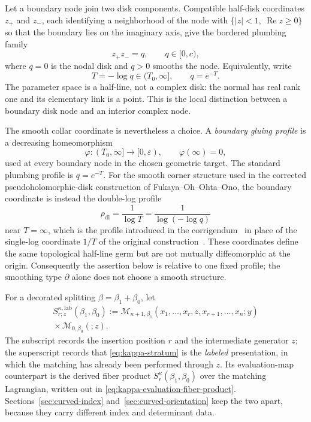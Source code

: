 \documentclass[11pt,letterpaper,twoside]{article}
\theoremstyle{plain}
\theoremstyle{definition}
\theoremstyle{remark}
\let\cite\citep
\begin{document}
Let a boundary node join two disk components.  Compatible half-disk coordinates \(z_+\) and \(z_-\), each identifying a neighborhood of the node with \(\{|z|<1,\ \operatorname{Re}z\geq0\}\) so that the boundary lies on the imaginary axis, give the bordered plumbing family
\begin{equation}\label{eq:boundary-plumbing}
 z_+z_-=q,
 \qquad q\in[0,c),
\end{equation}
where \(q=0\) is the nodal disk and \(q>0\) smooths the node.  Equivalently, write
\begin{equation}\label{eq:neck-length}
 T=-\log q\in(T_0,\infty],
 \qquad q=e^{-T}.
\end{equation}
The parameter space is a half-line, not a complex disk: the normal has real rank one and its elementary link is a point.  This is the local distinction between a boundary disk node and an interior complex node.

The smooth collar coordinate is nevertheless a choice.  A \emph{boundary gluing profile} is a decreasing homeomorphism
\[
 \varphi:(T_0,\infty]\longrightarrow[0,\varepsilon),
 \qquad \varphi(\infty)=0,
\]
used at every boundary node in the chosen geometric target.  The standard plumbing profile is \(q=e^{-T}\).  For the smooth corner structure used in the corrected pseudoholomorphic-disk construction of Fukaya--Oh--Ohta--Ono, the boundary coordinate is instead the double-log profile
\begin{equation}\label{eq:double-log-profile}
 \rho_{\mathrm{dl}}=\frac{1}{\log T}
 =\frac{1}{\log(-\log q)}
\end{equation}
near \(T=\infty\), which is the profile introduced in the corrigendum~\cite{fooo2024corrigendum} in place of the single-log coordinate \(1/T\) of the original construction~\cite{fooo2018kuranishi1}.  These coordinates define the same topological half-line germ but are not mutually diffeomorphic at the origin.  Consequently the assertion below is relative to one fixed profile; the smoothing type \(\partial\) alone does not choose a smooth structure.

For a decorated splitting \(\beta=\beta_1+\beta_0\), let
\begin{multline}\label{eq:kappa-stratum}
 S^{\kappa,\mathrm{lab}}_{r;z}(\beta_1,\beta_0)
 :=\mathcal M_{n+1,\beta_1}
 (x_1,\ldots,x_r,z,x_{r+1},\ldots,x_n;y)
 \\
 {}\times\mathcal M_{0,\beta_0}(;z).
\end{multline}
The subscript records the insertion position \(r\) and the intermediate generator \(z\); the superscript records that \eqref{eq:kappa-stratum} is the \emph{labeled} presentation, in which the matching has already been performed through \(z\).  Its evaluation-map counterpart is the derived fiber product \(S^{\kappa}_r(\beta_1,\beta_0)\) over the matching Lagrangian, written out in \eqref{eq:kappa-evaluation-fiber-product}.  Sections~\ref{sec:curved-index} and~\ref{sec:curved-orientation} keep the two apart, because they carry different index and determinant data.
\end{document}

